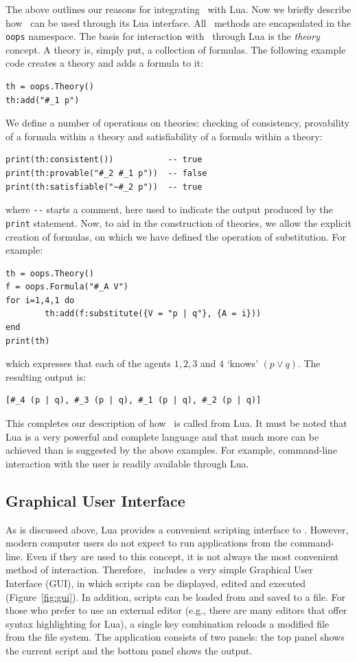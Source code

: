 The above outlines our reasons for integrating \oops\ with Lua. Now
we briefly describe how \oops\ can be used through its Lua interface.
All \oops\ methods are encapsulated in the \lstinline!oops! namespace.
The basis for interaction with \oops\ through Lua is the {\em theory} concept.
A theory is, simply put, a collection of formulas. The following example code
creates a theory and adds a formula to it:
\begin{lstlisting}
th = oops.Theory()
th:add("#_1 p")
\end{lstlisting}
We define a number of operations on theories: checking of consistency,
provability of a formula within a theory and satisfiability of a formula
within a theory:
\begin{lstlisting}
print(th:consistent())           -- true
print(th:provable("#_2 #_1 p"))  -- false
print(th:satisfiable("~#_2 p"))  -- true
\end{lstlisting}
where \lstinline!--! starts a comment, here used to indicate the output
produced by the \lstinline!print! statement. 
Now, to aid in the construction of theories, we allow the explicit creation of
formulas, on which we have defined the operation of substitution. For example:
\begin{lstlisting}
th = oops.Theory()
f = oops.Formula("#_A V")
for i=1,4,1 do
        th:add(f:substitute({V = "p | q"}, {A = i}))
end
print(th)
\end{lstlisting}
which expresses that each of the agents $1, 2, 3$ and $4$ `knows' $(p \vee
q)$. The resulting output is:
\begin{lstlisting}
[#_4 (p | q), #_3 (p | q), #_1 (p | q), #_2 (p | q)]
\end{lstlisting}

This completes our description of how \oops\ is called from Lua. It must be
noted that Lua is a very powerful and complete language and that much more can be achieved than is suggested by the above examples. For
example, command-line interaction with the user is readily available through
Lua.

\subsection{Graphical User Interface}

As is discussed above, Lua provides a convenient scripting interface to \oops.
However, modern computer users do not expect to run applications from the
command-line. Even if they are used to this concept, it is not always the most
convenient method of interaction. Therefore,
\oops\ includes a very simple Graphical User Interface (GUI), in which scripts
can be displayed, edited and executed (Figure~\ref{fig:gui}). In addition,
scripts can be loaded from and saved to a file. For those who prefer to use an
external editor (e.g., there are many editors that offer syntax highlighting
for Lua), a single key combination reloads a modified file from the
file system. The application consists of two panels: the top panel shows the
current script and the bottom panel shows the
output.

